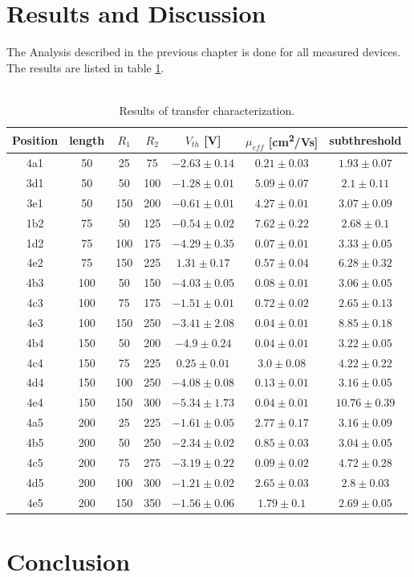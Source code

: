 \documentclass[%
 reprint,
amsmath,amssymb,
pra,
]{revtex4-1}
\begin{document}
\section{Results and Discussion}
The Analysis described in the previous chapter is done for all measured devices. The results are listed in table \ref{tab:transfer_results}.\\
\\



\begin{table}
\centering
\begin{tabular}{|c|c|c|c|c|c|c|}
\hline 
Position & length & $R_1$ & $R_2$ & $V_{th}$ [\si{\volt}]  & $\mu_{eff}$  [\si{cm^2/Vs}] & subthreshold \\ 
\hline 
4a1 & 50 & 25 & 75 & $-2.63\pm 0.14$ & $0.21\pm 0.03$ & $1.93\pm 0.07$\\
\hline 
3d1 & 50 & 50 & 100 & $-1.28\pm 0.01$ & $5.09\pm 0.07$& $2.1\pm 0.11$\\
\hline 
3e1 & 50 & 150 & 200 & $-0.61\pm 0.01$ & $4.27\pm 0.01$& $3.07\pm 0.09$\\
\hline 
\hline 
1b2 & 75 & 50 & 125 & $-0.54\pm 0.02$ & $7.62\pm 0.22$& $2.68\pm 0.1$\\
\hline 
1d2 & 75 & 100 & 175 & $-4.29\pm 0.35$ & $0.07\pm 0.01$& $3.33\pm 0.05$\\
\hline 
4e2 & 75 & 150 & 225 & $1.31\pm 0.17$ & $0.57\pm 0.04$& $6.28\pm 0.32$\\
\hline 
\hline  
4b3 & 100 & 50 & 150 & $-4.03\pm 0.05$ & $0.08\pm 0.01$& $3.06\pm 0.05$\\
\hline 
4c3 & 100 & 75 & 175 & $-1.51\pm 0.01$ & $0.72\pm 0.02$& $2.65\pm 0.13$\\
\hline 
4e3 & 100 & 150 & 250 & $-3.41\pm 2.08$ & $0.04\pm 0.01$& $8.85\pm 0.18$\\
\hline
\hline 
4b4 & 150 & 50 & 200 & $-4.9\pm 0.24$ & $0.04\pm 0.01$& $3.22\pm 0.05$\\
\hline
4c4 & 150 & 75 & 225 & $0.25\pm 0.01$ & $3.0\pm 0.08$& $4.22\pm 0.22$\\
\hline 
4d4 & 150 & 100 & 250 & $-4.08\pm 0.08$ & $0.13\pm 0.01$& $3.16\pm 0.05$\\
\hline 
4e4 & 150 & 150 & 300 & $-5.34\pm 1.73$ & $0.04\pm 0.01$& $10.76\pm 0.39$\\
\hline 
\hline 
4a5 & 200 & 25 & 225 & $-1.61\pm 0.05$ & $2.77\pm 0.17$& $3.16\pm 0.09$\\
\hline 
4b5 & 200 & 50 & 250 & $-2.34\pm 0.02$ & $0.85\pm 0.03$& $3.04\pm 0.05$\\
\hline 
4c5 & 200 & 75 & 275 & $-3.19\pm 0.22$ & $0.09\pm 0.02$& $4.72\pm 0.28$\\
\hline
4d5 & 200 & 100 & 300 & $-1.21\pm 0.02$ & $2.65\pm 0.03$& $2.8\pm 0.03$\\
\hline 
4e5 & 200 & 150 & 350 & $-1.56\pm 0.06$ & $1.79\pm 0.1$& $2.69\pm 0.05$\\
\hline 
\end{tabular} 
\caption{Results of transfer characterization.}
\label{tab:transfer_results}
\end{table}

\section{Conclusion}

\end{document}
